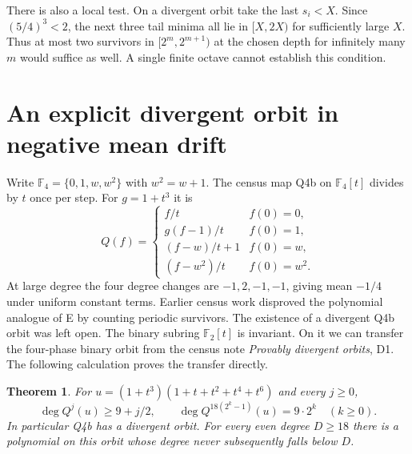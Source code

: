 \documentclass[11pt,a4paper]{article}
\newtheorem{theorem}{Theorem}
\newcommand{\F}{\mathbb F}
\begin{document}
There is also a local test. On a divergent orbit take the last $s_i<X$. Since $(5/4)^3<2$, the next three tail minima all lie in $[X,2X)$ for sufficiently large $X$. Thus at most two survivors in $[2^m,2^{m+1})$ at the chosen depth for infinitely many $m$ would suffice as well. A single finite octave cannot establish this condition.
\newpage
\section{An explicit divergent orbit in negative mean drift}
Write $\F_4=\{0,1,w,w^2\}$ with $w^2=w+1$. The census map Q4b on $\F_4[t]$ divides by $t$ once per step. For $g=1+t^3$ it is
\[
 Q(f)=\begin{cases}
 f/t & f(0)=0,\\ g(f-1)/t & f(0)=1,\\ (f-w)/t+1 & f(0)=w,\\ (f-w^2)/t & f(0)=w^2 .
 \end{cases}
\]
At large degree the four degree changes are $-1,2,-1,-1$, giving mean $-1/4$ under uniform constant terms. Earlier census work disproved the polynomial analogue of E by counting periodic survivors. The existence of a divergent Q4b orbit was left open. The binary subring $\F_2[t]$ is invariant. On it we can transfer the four-phase binary orbit from the census note \emph{Provably divergent orbits}, D1. The following calculation proves the transfer directly.
\begin{theorem}
For $u=(1+t^3)(1+t+t^2+t^4+t^6)$ and every $j\ge0$,
\[
 \deg Q^j(u)\ge 9+j/2,\qquad
 \deg Q^{18(2^k-1)}(u)=9\cdot2^k\quad(k\ge0).
\]
In particular Q4b has a divergent orbit. For every even degree $D\ge18$ there is a polynomial on this orbit whose degree never subsequently falls below $D$.
\end{theorem}
\end{document}
